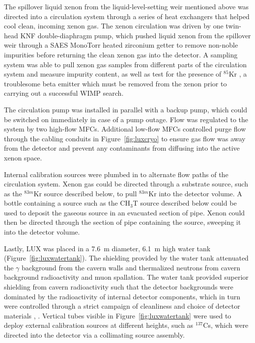 The spillover liquid xenon from the liquid-level-setting weir mentioned above was directed into a circulation system through a series of heat exchangers that helped cool clean, incoming xenon gas. The xenon circulation was driven by one twin-head KNF double-diaphragm pump, which pushed liquid xenon from the spillover weir through a SAES MonoTorr heated zirconium getter to remove non-noble impurities before returning the clean xenon gas into the detector. A sampling system was able to pull xenon gas samples from different parts of the circulation system and measure impurity content, as well as test for the presence of $^{85}$Kr \cite{Dobi2011}, a troublesome beta emitter which must be removed from the xenon prior to carrying out a successful \ac{WIMP} search.

The circulation pump was installed in parallel with a backup pump, which could be switched on immediately in case of a pump outage. Flow was regulated to the system by two high-flow \ac{MFC}s. Additional low-flow \ac{MFC}s controlled purge flow through the cabling conduits in Figure~\ref{fig:luxcryo} to ensure gas flow was away from the detector and prevent any contaminants from diffusing into the active xenon space.

Internal calibration sources were plumbed in to alternate flow paths of the circulation system. Xenon gas could be directed through a substrate source, such as the $^{83m}$Kr source described below, to pull $^{83m}$Kr into the detector volume. A bottle containing a source such as the CH$_{3}$T source described below could be used to deposit the gaseous source in an evacuated section of pipe. Xenon could then be directed through the section of pipe containing the source, sweeping it into the detector volume. 

Lastly, \ac{LUX} was placed in a 7.6~m diameter, 6.1~m high water tank (Figure~\ref{fig:luxwatertank}). The shielding provided by the water tank attenuated the $\gamma$ background from the cavern walls and thermalized neutrons from cavern background radioactivity and muon spallation. The water tank provided superior shielding from cavern radioactivity such that the detector backgrounds were dominated by the radioactivity of internal detector components, which in turn were controlled through a strict campaign of cleanliness and choice of detector materials \cite{LUXDetectorPaper}, \cite{LUXRun03Backgrounds}. Vertical tubes visible in Figure~\ref{fig:luxwatertank} were used to deploy external calibration sources at different heights, such as $^{137}$Cs, which were directed into the detector via a collimating source assembly.


